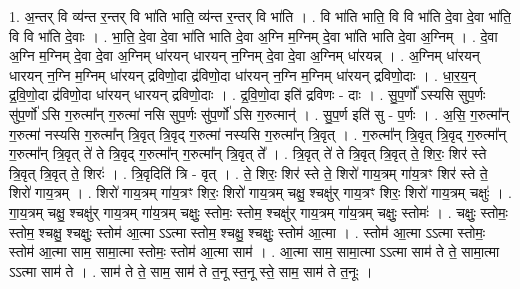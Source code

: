 \documentclass[17pt]{extarticle}
\begin{document}
1. अ॒न्तर् वि व्य॑न्त र॒न्तर् वि भा॑ति भाति॒ व्य॑न्त र॒न्तर् वि भा॑ति । . वि भा॑ति भाति॒ वि वि भा॑ति दे॒वा दे॒वा भा॑ति॒ वि वि भा॑ति दे॒वाः । . भा॒ति॒ दे॒वा दे॒वा भा॑ति भाति दे॒वा अ॒ग्नि म॒ग्निम् दे॒वा भा॑ति भाति दे॒वा अ॒ग्निम् । . दे॒वा अ॒ग्नि म॒ग्निम् दे॒वा दे॒वा अ॒ग्निम् धा॑रयन् धारयन् न॒ग्निम् दे॒वा दे॒वा अ॒ग्निम् धा॑रयन्न् । . अ॒ग्निम् धा॑रयन् धारयन् न॒ग्नि म॒ग्निम् धा॑रयन् द्रविणो॒दा द्र॑विणो॒दा धा॑रयन् न॒ग्नि म॒ग्निम् धा॑रयन् द्रविणो॒दाः । . धा॒र॒य॒न् द्र॒वि॒णो॒दा द्र॑विणो॒दा धा॑रयन् धारयन् द्रविणो॒दाः । . द्र॒वि॒णो॒दा इति॑ द्रविणः - दाः । . सु॒प॒र्णो᳚ ऽस्यसि सुप॒र्णः सु॑प॒र्णो॑ ऽसि ग॒रुत्मा᳚न् ग॒रुत्मा॑ नसि सुप॒र्णः सु॑प॒र्णो॑ ऽसि ग॒रुत्मान्॑ । . सु॒प॒र्ण इति॑ सु - प॒र्णः । . अ॒सि॒ ग॒रुत्मा᳚न् ग॒रुत्मा॑ नस्यसि ग॒रुत्मा᳚न् त्रि॒वृत् त्रि॒वृद् ग॒रुत्मा॑ नस्यसि ग॒रुत्मा᳚न् त्रि॒वृत् । . ग॒रुत्मा᳚न् त्रि॒वृत् त्रि॒वृद् ग॒रुत्मा᳚न् ग॒रुत्मा᳚न् त्रि॒वृत् ते॑ ते त्रि॒वृद् ग॒रुत्मा᳚न् ग॒रुत्मा᳚न् त्रि॒वृत् ते᳚ । . त्रि॒वृत् ते॑ ते त्रि॒वृत् त्रि॒वृत् ते॒ शिरः॒ शिर॑ स्ते त्रि॒वृत् त्रि॒वृत् ते॒ शिरः॑ । . त्रि॒वृदिति॑ त्रि - वृत् । . ते॒ शिरः॒ शिर॑ स्ते ते॒ शिरो॑ गाय॒त्रम् गा॑य॒त्रꣳ शिर॑ स्ते ते॒ शिरो॑ गाय॒त्रम् । . शिरो॑ गाय॒त्रम् गा॑य॒त्रꣳ शिरः॒ शिरो॑ गाय॒त्रम् चक्षु॒ श्चक्षु॑र् गाय॒त्रꣳ शिरः॒ शिरो॑ गाय॒त्रम् चक्षुः॑ । . गा॒य॒त्रम् चक्षु॒ श्चक्षु॑र् गाय॒त्रम् गा॑य॒त्रम् चक्षुः॒ स्तोमः॒ स्तोम॒ श्चक्षु॑र् गाय॒त्रम् गा॑य॒त्रम् चक्षुः॒ स्तोमः॑ । . चक्षुः॒ स्तोमः॒ स्तोम॒ श्चक्षु॒ श्चक्षुः॒ स्तोम॑ आ॒त्मा ऽऽत्मा स्तोम॒ श्चक्षु॒ श्चक्षुः॒ स्तोम॑ आ॒त्मा । . स्तोम॑ आ॒त्मा ऽऽत्मा स्तोमः॒ स्तोम॑ आ॒त्मा साम॒ सामा॒त्मा स्तोमः॒ स्तोम॑ आ॒त्मा साम॑ । . आ॒त्मा साम॒ सामा॒त्मा ऽऽत्मा साम॑ ते ते॒ सामा॒त्मा ऽऽत्मा साम॑ ते । . साम॑ ते ते॒ साम॒ साम॑ ते त॒नू स्त॒नू स्ते॒ साम॒ साम॑ ते त॒नूः । \newline
\end{document}
